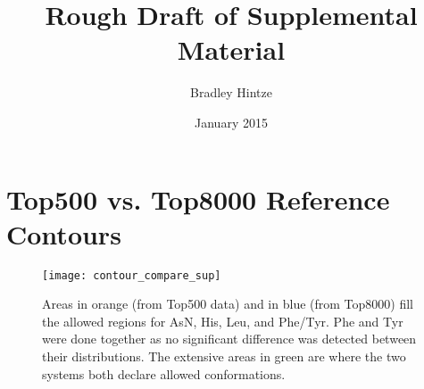 \documentclass{article}
\begin{document}
\title{Rough Draft of Supplemental Material}
\author{Bradley Hintze}
\date{January 2015}
\maketitle
\tableofcontents

\newpage

\newpage
\section{Top500 vs. Top8000 Reference Contours}
\begin{figure}[h]
  \centering
  \texttt{[image: contour\_compare\_sup]}
  \caption{Areas in orange (from Top500 data) and in blue (from Top8000) fill
      the allowed regions for AsN, His, Leu, and Phe/Tyr. Phe and Tyr were done
      together as no significant difference was detected between their distributions.
      The extensive areas in green are where the two systems both declare allowed 
      conformations.}
    \label{fig:outcounts}
\end{figure}
\newpage

\newpage

\newpage

\newpage
%
\end{document}
